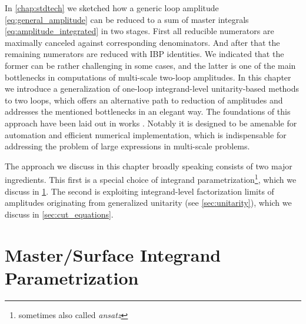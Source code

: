 In \cref{chap:stdtech} we sketched how a generic loop amplitude \eqref{eq:general_amplitude} can be reduced
to a sum of master integrals \eqref{eq:amplitude_integrated} in two stages.
First all reducible numerators are maximally canceled against corresponding denominators.
And after that the remaining numerators are reduced with IBP identities.
We indicated that the former can be rather challenging in some cases,
and the latter is one of the main bottlenecks in computations of
multi-scale two-loop amplitudes.
In this chapter we introduce a generalization of one-loop integrand-level unitarity-based methods \cite{Ossola:2006us,Giele:2008ve,Ellis:2008ir}
to two loops, which offers an alternative path to reduction of amplitudes and addresses the mentioned bottlenecks in an elegant way.
The foundations of this approach have been laid out in works \cite{Ita:2015tya,Abreu:2017xsl,Abreu:2017hqn,Abreu:2017idw}.
Notably it is designed to be amenable for automation and efficient numerical implementation, which is indispensable
for addressing the problem of large expressions in multi-scale problems.


The approach we discuss in this chapter broadly speaking consists of two major ingredients.
This first is a special choice of integrand parametrization\footnote{sometimes also called \emph{ansatz}},
which we discuss in \cref{sec:ansatz_integrand}.
The second is exploiting integrand-level factorization limits of amplitudes originating from generalized unitarity (see \cref{sec:unitarity}),
which we discuss in \cref{sec:cut_equations}.



\section{Master/Surface Integrand Parametrization}
\label{sec:ansatz_integrand}

